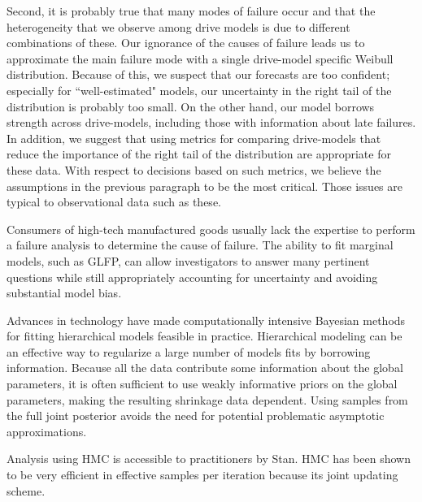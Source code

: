 \documentclass[12pt]{article}
\begin{document}
Second, it is probably true that many modes of failure occur and that the heterogeneity that we observe among drive models is due to different combinations of these. Our ignorance of the causes of failure leads us to approximate the main failure mode with a single drive-model specific Weibull distribution. Because of this, we suspect that our forecasts are too confident; especially for ``well-estimated" models, our uncertainty in the right tail of the distribution is probably too small. On the other hand, our model borrows strength across drive-models, including those with information about late failures. In addition, we suggest that using metrics for comparing drive-models that reduce the importance of the right tail of the distribution are appropriate for these data. With respect to decisions based on such metrics, we believe the assumptions in the previous paragraph to be the most critical. Those issues are typical to observational data such as these.

Consumers of high-tech manufactured goods usually lack the expertise to perform a failure analysis to determine the cause of failure. The ability to fit marginal models, such as GLFP, can allow investigators to answer many pertinent questions while still appropriately accounting for uncertainty and avoiding substantial model bias.

Advances in technology have made computationally intensive Bayesian methods for fitting hierarchical models feasible in practice. Hierarchical modeling can be an effective way to regularize a large number of models fits by borrowing information. Because all the data contribute some information about the global parameters, it is often sufficient to use weakly informative priors on the global parameters, making the resulting shrinkage data dependent. Using samples from the full joint posterior avoids the need for potential problematic asymptotic approximations.

Analysis using HMC is accessible to practitioners by Stan. HMC has been shown to be very efficient in effective samples per iteration because its joint updating scheme.
\end{document}
